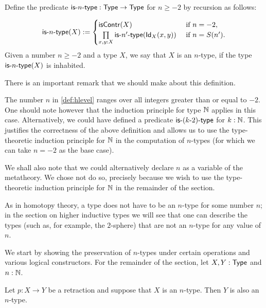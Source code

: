 \begin{defn}\label{def:hlevel}
  Define the predicate $\istype{n} : \Type \to \Type$ for $n \geq -2$ by recursion as follows:

\[ \istype{n}(X) := \begin{cases}
                         \iscontr(X) & \text{ if } n = -2 , \\
                         \prod\limits_{x,y : X}\istype{n'}(\idtype[X]{x}{y}) & \text{ if } n = S(n') .
                        \end{cases}
\]
%
Given a number $n \geq -2$ and a type $X$, we say that $X$ is an $n$-type, if the type $\istype{n}(X)$ is inhabited.
\end{defn}

There is an important remark that we should make about this definition.

\begin{rmk}
 The number $n$ in \autoref{def:hlevel} ranges over all integers greater than or equal to $-2$. One should note however that the induction principle for type $\Nat$ applies in this case.  Alternatively, we could have defined a predicate $\istype{(k\mbox{-}2)}$ for $k : \Nat$. This justifies the correctness of the above definition and allows us to use the type-theoretic induction principle for $\Nat$ in the computation of $n$-types (for which we can take $n = -2$ as the base case).
 
 We shall also note that we could alternatively declare $n$ as a variable of the metatheory. We chose not do so, precisely because we wish to use the type-theoretic induction principle for $\Nat$ in the remainder of the section.
\end{rmk}

As in homotopy theory, a type does not have to be an $n$-type for some number $n$; in the section on higher inductive types we will see that one can describe the types (such as, for example, the $2$-sphere) that are not an $n$-type for any value of $n$.

We start by showing the preservation of $n$-types under certain operations and various logical constructors.
For the remainder of the section, let $X, Y : \Type$ and $n : \Nat$.
\begin{thm}\label{thm:h-level-retracts}
 Let $p \colon X \to Y$ be a retraction and suppose that $X$ is an $n$-type. Then $Y$ is also an $n$-type.
\end{thm}

